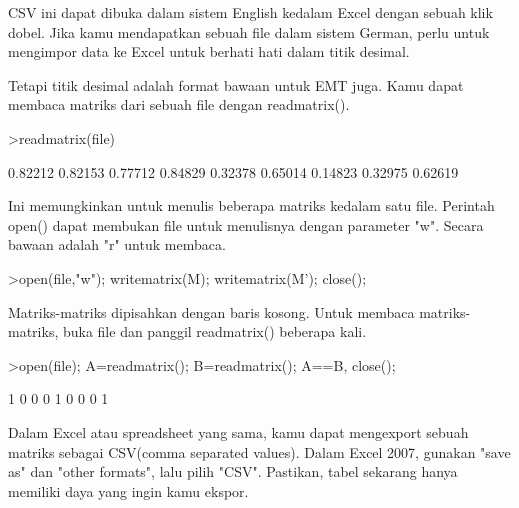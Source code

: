 \documentclass[a4paper,10pt]{article}
\begin{document}
\begin{eulernotebook}
\begin{eulercomment}
\begin{eulercomment}
\begin{eulercomment}
\begin{eulercomment}
\begin{eulercomment}
\begin{eulercomment}
\begin{euleroutput}
\end{euleroutput}
\begin{eulercomment}
CSV ini dapat dibuka dalam sistem English kedalam Excel dengan sebuah
klik dobel. Jika kamu mendapatkan sebuah file dalam sistem German,
perlu untuk mengimpor data ke Excel untuk berhati hati dalam titik
desimal.

Tetapi titik desimal adalah format bawaan untuk EMT juga. Kamu dapat
membaca matriks dari sebuah file dengan readmatrix().
\end{eulercomment}
\begin{eulerprompt}
>readmatrix(file)
\end{eulerprompt}
\begin{euleroutput}
    0.82212   0.82153   0.77712 
    0.84829   0.32378   0.65014 
    0.14823   0.32975   0.62619 
\end{euleroutput}
\begin{eulercomment}
Ini memungkinkan untuk menulis beberapa matriks kedalam satu file.
Perintah open() dapat membukan file untuk menulisnya dengan parameter
"w". Secara bawaan adalah "r" untuk membaca.
\end{eulercomment}
\begin{eulerprompt}
>open(file,"w"); writematrix(M); writematrix(M'); close();
\end{eulerprompt}
\begin{eulercomment}
Matriks-matriks dipisahkan dengan baris kosong. Untuk membaca
matriks-matriks, buka file dan panggil readmatrix() beberapa kali.
\end{eulercomment}
\begin{eulerprompt}
>open(file); A=readmatrix(); B=readmatrix(); A==B, close();
\end{eulerprompt}
\begin{euleroutput}
          1         0         0 
          0         1         0 
          0         0         1 
\end{euleroutput}
\begin{eulercomment}
Dalam Excel atau spreadsheet yang sama, kamu dapat mengexport sebuah
matriks sebagai CSV(comma separated values). Dalam Excel 2007, gunakan
"save as" dan "other formats", lalu pilih "CSV". Pastikan, tabel
sekarang hanya memiliki daya yang ingin kamu ekspor.


\end{eulercomment}
\end{eulercomment}
\end{eulercomment}
\end{eulercomment}
\end{eulercomment}
\end{eulercomment}
\end{eulercomment}
\end{eulernotebook}
\end{document}
